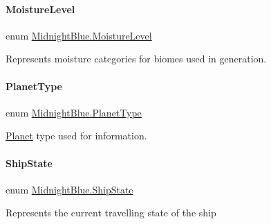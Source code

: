 \hypertarget{namespace_midnight_blue_a7428767e7fc0b52bab6cb270f8354e1d}{}\label{namespace_midnight_blue_a7428767e7fc0b52bab6cb270f8354e1d} 
\paragraph{\texorpdfstring{Moisture\+Level}{MoistureLevel}}
{\footnotesize\ttfamily enum \hyperlink{namespace_midnight_blue_a7428767e7fc0b52bab6cb270f8354e1d}{Midnight\+Blue.\+Moisture\+Level}\hspace{0.3cm}{\ttfamily [strong]}}



Represents moisture categories for biomes used in generation. 

\hypertarget{namespace_midnight_blue_a4a799009a18b57979628708589ae53e3}{}\label{namespace_midnight_blue_a4a799009a18b57979628708589ae53e3} 
\paragraph{\texorpdfstring{Planet\+Type}{PlanetType}}
{\footnotesize\ttfamily enum \hyperlink{namespace_midnight_blue_a4a799009a18b57979628708589ae53e3}{Midnight\+Blue.\+Planet\+Type}\hspace{0.3cm}{\ttfamily [strong]}}



\hyperlink{class_midnight_blue_1_1_planet}{Planet} type used for information. 

\hypertarget{namespace_midnight_blue_a46fd3250d826e0dec67892328d5b368c}{}\label{namespace_midnight_blue_a46fd3250d826e0dec67892328d5b368c} 
\paragraph{\texorpdfstring{Ship\+State}{ShipState}}
{\footnotesize\ttfamily enum \hyperlink{namespace_midnight_blue_a46fd3250d826e0dec67892328d5b368c}{Midnight\+Blue.\+Ship\+State}\hspace{0.3cm}{\ttfamily [strong]}}



Represents the current travelling state of the ship 


